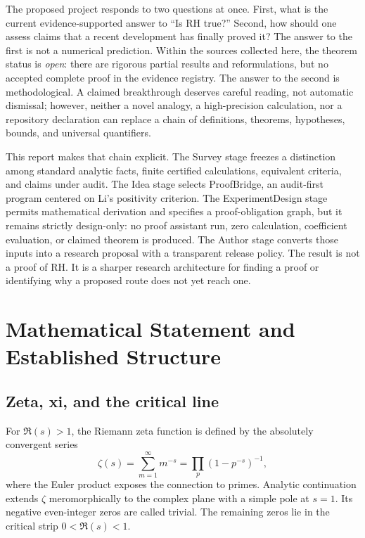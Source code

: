 \documentclass[conference]{../../../../Conference-LaTeX-template_10-17-19/IEEEtran}
\begin{document}
The proposed project responds to two questions at once. First, what is the current evidence-supported answer to ``Is RH true?'' Second, how should one assess claims that a recent development has finally proved it? The answer to the first is not a numerical prediction. Within the sources collected here, the theorem status is \emph{open}: there are rigorous partial results and reformulations, but no accepted complete proof in the evidence registry. The answer to the second is methodological. A claimed breakthrough deserves careful reading, not automatic dismissal; however, neither a novel analogy, a high-precision calculation, nor a repository declaration can replace a chain of definitions, theorems, hypotheses, bounds, and universal quantifiers.

This report makes that chain explicit. The Survey stage freezes a distinction among standard analytic facts, finite certified calculations, equivalent criteria, and claims under audit. The Idea stage selects ProofBridge, an audit-first program centered on Li's positivity criterion. The ExperimentDesign stage permits mathematical derivation and specifies a proof-obligation graph, but it remains strictly design-only: no proof assistant run, zero calculation, coefficient evaluation, or claimed theorem is produced. The Author stage converts those inputs into a research proposal with a transparent release policy. The result is not a proof of RH. It is a sharper research architecture for finding a proof or identifying why a proposed route does not yet reach one.

\section{Mathematical Statement and Established Structure}
\subsection{Zeta, xi, and the critical line}
For $\Re(s)>1$, the Riemann zeta function is defined by the absolutely convergent series
\begin{equation}
 \zeta(s)=\sum_{m=1}^{\infty}m^{-s}=\prod_p(1-p^{-s})^{-1},
\end{equation}
where the Euler product exposes the connection to primes. Analytic continuation extends $\zeta$ meromorphically to the complex plane with a simple pole at $s=1$. Its negative even-integer zeros are called trivial. The remaining zeros lie in the critical strip $0<\Re(s)<1$.
\end{document}
